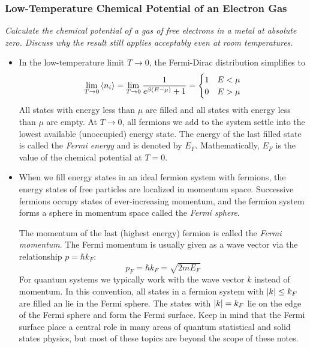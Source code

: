 \documentclass[11pt, a4paper]{article}
\begin{document}
\subsubsection{Low-Temperature Chemical Potential of an Electron Gas}
\textit{Calculate the chemical potential of a gas of free electrons in a metal at absolute zero. Discuss why the result still applies acceptably even at room temperatures.}

\begin{itemize}
	\item In the low-temperature limit $ T \to 0 $, the Fermi-Dirac distribution simplifies to
	\begin{equation*}
		\lim_{T \to 0} \expval{n_{i}} = \lim_{T \to 0} \frac{1}{e^{\beta(E - \mu)} + 1} = 
		\begin{cases}
			1 & E < \mu\\
			0 & E > \mu
		\end{cases}
	\end{equation*}
	All states with energy less than $ \mu $ are filled and all states with energy less than $ \mu $ are empty. At $ T \to 0 $, all fermions we add to the system settle into the lowest available (unoccupied) energy state. The energy of the last filled state is called the \textit{Fermi energy} and is denoted by $ E_{F} $. Mathematically, $ E_{F} $ is the value of the chemical potential at $ T = 0 $. 
	
	\item When we fill energy states in an ideal fermion system with fermions, the energy states of free particles are localized in momentum space. Successive fermions occupy states of ever-increasing momentum, and the fermion system forms a sphere in momentum space called the \textit{Fermi sphere}. 
	
	The momentum of the last (highest energy) fermion is called the \textit{Fermi momentum}. The Fermi momentum is usually given as a wave vector via the relationship $ p = \hbar k_{F} $:
	\begin{equation*}
		p_{F} = \hbar k_{F} = \sqrt{2mE_{F}}
	\end{equation*}
	For quantum systems we typically work with the wave vector $ k $ instead of momentum. In this convention, all states in a fermion system with $ \abs{k} \leq k_{F} $  are filled an lie in the Fermi sphere. The states with $ \abs{k} = k_{F} $ lie on the edge of the Fermi sphere and form the Fermi surface. Keep in mind that the Fermi surface place a central role in many areas of quantum statistical and solid states physics, but most of these topics are beyond the scope of these notes.
	

\end{itemize}
\end{document}

